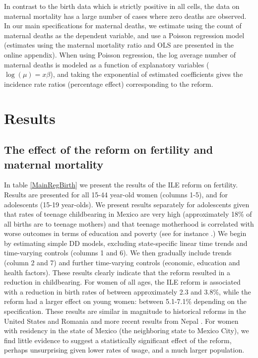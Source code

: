 \documentclass[a4paper, 11pt]{article}
\begin{document}
\begin{spacing}{2}
In contrast to the birth data which is strictly positive in all cells, the data on maternal mortality has a large number of cases where zero deaths are observed.  In our main specifications for maternal deaths, we estimate using the count of maternal deaths as the dependent variable, and use a Poisson regression model (estimates using the maternal mortality ratio and OLS are presented in the online appendix).%
When using Poisson regression, the log average number of maternal deaths is modeled as a function of explanatory variables ($\log(\mu) =x\beta$), and taking the exponential of estimated coefficients gives the incidence rate ratios (percentage effect) corresponding to the reform.

\section{Results}\label{scn:results}
\subsection{The effect of the reform on fertility and maternal mortality}\label{main}
In table \ref{MainRegBirth} we present the results of the ILE reform on fertility.  Results are presented for all 15-44 year-old women (columns 1-5), and for adolescents (15-19 year-olds).  We present results separately for adolescents given that rates of teenage childbearing in Mexico are very high (approximately 18\% of all births are to teenage mothers) and that teenage motherhood is correlated with worse outcomes in terms of education and poverty (see for instance \citep{furstenberg1976unplanned}.)  We begin by estimating simple DD models, excluding state-specific linear time trends and time-varying controls (columns 1 and 6).  We then gradually include trends (column 2 and 7) and further time-varying controls (economic, education and health factors).  These results clearly indicate that the reform resulted in a reduction in childbearing.  For women of all ages, the ILE reform is associated with a reduction in birth rates of between approximately 2.3 and 3.8\%, while the reform had a larger effect on young women: between 5.1-7.1\% depending on the specification. These results are similar in magnitude to historical reforms in the United States and Romania \citep{levine2004,PopEleches2010} and more recent results from Nepal \citep{Valente2014}. For women with residency in the state of Mexico (the neighboring state to Mexico City), we find little evidence to suggest a statistically significant effect of the reform, perhaps unsurprising given lower rates of usage, and a much larger population. 


\end{spacing}
\end{document}
